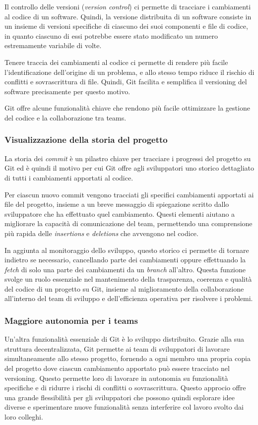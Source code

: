 Il controllo delle versioni (\textit{version control}) ci permette di tracciare i cambiamenti al codice di un software. Quindi, la versione distribuita di un software consiste in un insieme di versioni specifiche di ciascuno dei suoi componenti e file di codice, in quanto ciascuno di essi potrebbe essere stato modificato un numero estremamente variabile di volte.

Tenere traccia dei cambiamenti al codice ci permette di rendere più facile l'identificazione dell'origine di un problema, e allo stesso tempo riduce il rischio di conflitti e sovrascrittura di file. Quindi, Git facilita e semplifica il versioning del software precisamente per questo motivo.

Git offre alcune funzionalità chiave che rendono più facile ottimizzare la gestione del codice e la collaborazione tra teams.

\subsubsection{Visualizzazione della storia del progetto}
La storia dei \textit{commit} è un pilastro chiave per tracciare i progressi del progetto su Git ed è quindi il motivo per cui Git offre agli sviluppatori uno storico dettagliato di tutti i cambiamenti apportati al codice.

Per ciascun nuovo commit vengono tracciati gli specifici cambiamenti apportati ai file del progetto, insieme a un breve messaggio di spiegazione scritto dallo sviluppatore che ha effettuato quel cambiamento. Questi elementi aiutano a migliorare la capacità di comunicazione del team, permettendo una comprensione più rapida delle \textit{insertions} e \textit{deletions} che avvengono nel codice.

In aggiunta al monitoraggio dello sviluppo, questo storico ci permette di tornare indietro se necessario, cancellando parte dei cambiamenti oppure effettuando la \textit{fetch} di solo una parte dei cambiamenti da un \textit{branch} all'altro. Questa funzione svolge un ruolo essenziale nel mantenimento della trasparenza, coerenza e qualità del codice di un progetto su Git, insieme al miglioramento della collaborazione all'interno del team di sviluppo e dell'efficienza operativa per risolvere i problemi.

\subsubsection{Maggiore autonomia per i teams}
Un'altra funzionalità essenziale di Git è lo sviluppo distribuito. Grazie alla sua struttura decentralizzata, Git permette ai team di sviluppatori di lavorare simultaneamente allo stesso progetto, fornendo a ogni membro una propria copia del progetto dove ciascun cambiamento apportato può essere tracciato nel versioning. Questo permette loro di lavorare in autonomia su funzionalità specifiche e di ridurre i rischi di conflitti o sovrascrittura. Questo approcio offre una grande flessibilità per gli sviluppatori che possono quindi esplorare idee diverse e sperimentare nuove funzionalità senza interferire col lavoro svolto dai loro colleghi.

